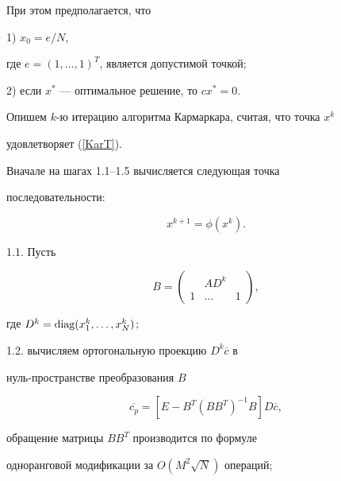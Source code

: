 При этом предполагается, что 





\noindent{}1) $x_0 = e/N$,


где $e=(1,\dotsc,1)^T$, является допустимой точкой;





\noindent{}2) если $x^*$ --- оптимальное решение, то $cx^* =0$.





Опишем $k$-ю итерацию алгоритма Кармаркара, считая, что точка $x^k$


удовлетворяет (\ref{KarT}).





Вначале на шагах 1.1--1.5 вычисляется следующая точка


последовательности:


$$


x^{k+1}=\phi(x^k).


$$





1.1. Пусть


$$


B=


\begin{pmatrix}


\ &  AD^k  & \\


1 & \dotsc  & 1


\end{pmatrix},


$$


где $D^k=\operatorname{diag}(x^k_1,\dotsc,x^k_N)$;





1.2. вычисляем ортогональную проекцию $D^k\overline{c}$ в


нуль-пространстве преобразования $B$


\begin{equation}\label{progect}


\overline{c_p}=[E-B^{T}(BB^{T})^{-1}B]D\overline{c},


\end{equation}


обращение матрицы $BB^T$ производится по формуле


одноранговой модификации за $O(M^2\sqrt{N})$ операций;





